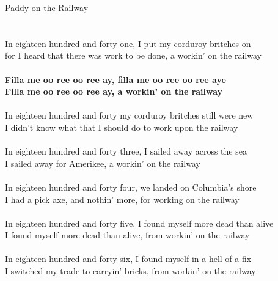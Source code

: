 \documentclass[letterpaper,9pt]{article}
\begin{document}
\newpage
{}
\huge
Paddy on the Railway\\
\\
\LARGE
\noindent
\\In eighteen hundred and forty one, I put my corduroy britches on
\\for I heard that there was work to be done, a workin' on the railway
\\
\\\textbf{Filla me oo ree oo ree ay, filla me oo ree oo ree aye
\\Filla me oo ree oo ree ay, a workin' on the railway}
\\
\\In eighteen hundred and forty my corduroy britches still were new
\\I didn't know what that I should do to work upon the railway
\\
\\In eighteen hundred and forty three, I sailed away across the sea
\\I sailed away for Amerikee, a workin' on the railway
\\
\\In eighteen hundred and forty four, we landed on Columbia's shore
\\I had a pick axe, and nothin' more, for working on the railway
\\
\\In eighteen hundred and forty five, I found myself more dead than alive
\\I found myself more dead than alive, from workin' on the railway
\\
\\In eighteen hundred and forty six, I found myself in a hell of a fix
\\I switched my trade to carryin' bricks, from workin' on the railway
\end{document}
